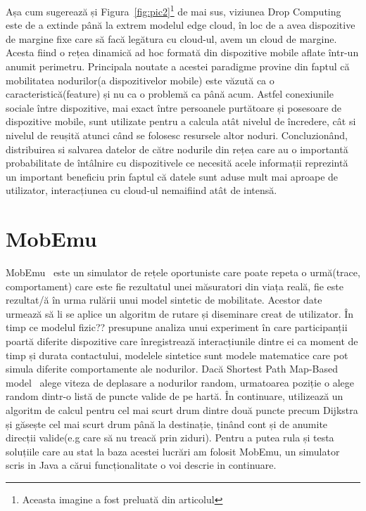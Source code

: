 \documentclass[12pt,a4paper]{report}
\begin{document}
Așa cum sugerează și Figura~\ref{fig:pic2}\footnote{Aceasta imagine a fost preluată din articolul\cite{DC}} de mai sus, viziunea Drop Computing este de a extinde până la extrem modelul edge cloud, în loc de a avea dispozitive de margine fixe care să facă legătura cu cloud-ul, avem un cloud de margine. Acesta fiind o rețea dinamică ad hoc formată din dispozitive mobile aflate într-un anumit perimetru. Principala noutate a acestei paradigme provine din faptul că mobilitatea nodurilor(a dispozitivelor mobile) este văzută ca o caracteristică(feature) și nu ca o problemă ca până acum. Astfel conexiunile sociale între dispozitive, mai exact între persoanele purtătoare și posesoare de dispozitive mobile, sunt utilizate pentru a calcula atât nivelul de încredere, cât si nivelul de reușită atunci când se folosesc resursele altor noduri. Concluzionând, distribuirea si salvarea datelor de către nodurile din rețea care au o importantă probabilitate de întâlnire cu dispozitivele ce necesită acele informații reprezintă un important beneficiu prin faptul că datele sunt aduse mult mai aproape de utilizator, interacțiunea cu cloud-ul nemaifiind atât de intensă.

\section{MobEmu}
MobEmu~\cite{MobEmuArticle} este un simulator de rețele oportuniste care poate repeta o urmă(trace, comportament) care este fie rezultatul unei măsuratori din viața reală, fie este rezultat/ă în urma rulării unui model sintetic de mobilitate. Acestor date urmează să li se aplice un algoritm de rutare și diseminare creat de utilizator.
În timp ce modelul fizic?? presupune analiza unui experiment în care participanții poartă diferite dispozitive care înregistrează interacțiunile dintre ei ca moment de timp și durata contactului, modelele sintetice sunt modele matematice care pot simula diferite comportamente ale nodurilor. Dacă Shortest Path Map-Based model~\cite{ShortestPathMapBased} alege viteza de deplasare a nodurilor random, urmatoarea poziție o alege random dintr-o listă de puncte valide de pe hartă. În continuare, utilizează un algoritm de calcul pentru cel mai scurt drum dintre două puncte precum Dijkstra și găsește cel mai scurt drum până la destinație, ținând cont și de anumite direcții valide(e.g care să nu treacă prin ziduri). 
Pentru a putea rula și testa soluțiile care au stat la baza acestei lucrări am folosit MobEmu, un simulator scris in Java a cărui funcționalitate o voi descrie in continuare. 
\end{document}
